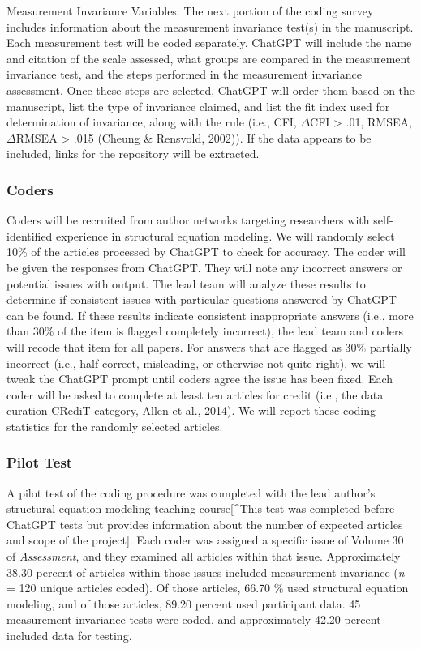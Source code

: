 \documentclass[
  english,
  man]{apa7}
\begin{document}
Measurement Invariance Variables: The next portion of the coding survey includes information about the measurement invariance test(s) in the manuscript. Each measurement test will be coded separately. ChatGPT will include the name and citation of the scale assessed, what groups are compared in the measurement invariance test, and the steps performed in the measurement invariance assessment. Once these steps are selected, ChatGPT will order them based on the manuscript, list the type of invariance claimed, and list the fit index used for determination of invariance, along with the rule (i.e., CFI, \(\Delta\)CFI \textgreater{} .01, RMSEA, \(\Delta\)RMSEA \textgreater{} .015 (Cheung \& Rensvold, 2002)). If the data appears to be included, links for the repository will be extracted.

\subsubsection{Coders}\label{coders}

Coders will be recruited from author networks targeting researchers with self-identified experience in structural equation modeling. We will randomly select 10\% of the articles processed by ChatGPT to check for accuracy. The coder will be given the responses from ChatGPT. They will note any incorrect answers or potential issues with output. The lead team will analyze these results to determine if consistent issues with particular questions answered by ChatGPT can be found. If these results indicate consistent inappropriate answers (i.e., more than 30\% of the item is flagged completely incorrect), the lead team and coders will recode that item for all papers. For answers that are flagged as 30\% partially incorrect (i.e., half correct, misleading, or otherwise not quite right), we will tweak the ChatGPT prompt until coders agree the issue has been fixed. Each coder will be asked to complete at least ten articles for credit (i.e., the data curation CRediT category, Allen et al., 2014). We will report these coding statistics for the randomly selected articles.

\subsubsection{Pilot Test}\label{pilot-test}

A pilot test of the coding procedure was completed with the lead author's structural equation modeling teaching course{[}\^{}This test was completed before ChatGPT tests but provides information about the number of expected articles and scope of the project{]}. Each coder was assigned a specific issue of Volume 30 of \emph{Assessment}, and they examined all articles within that issue. Approximately 38.30 percent of articles within those issues included measurement invariance (\emph{n} = 120 unique articles coded). Of those articles, 66.70 \% used structural equation modeling, and of those articles, 89.20 percent used participant data. 45 measurement invariance tests were coded, and approximately 42.20 percent included data for testing.
\end{document}
